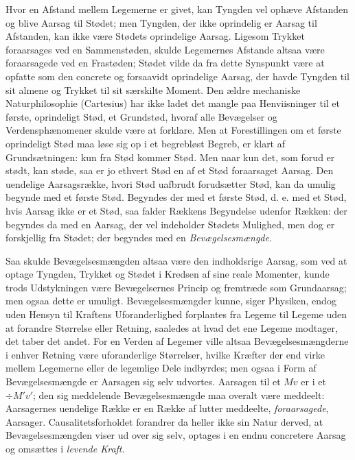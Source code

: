 \documentclass[12pt,a4paper]{book}
\begin{document}
Hvor en Afstand mellem Legemerne er givet, kan Tyngden vel ophæve
Afstanden og blive Aarsag til Stødet; men Tyngden, der ikke oprindelig er
Aarsag til Afstanden, kan ikke være Stødets oprindelige Aarsag. Ligesom
Trykket foraarsages ved en Sammenstøden, skulde Legemernes Afstande
altsaa være foraarsagede ved en Frastøden; Stødet vilde da fra dette
Synspunkt være at opfatte som den concrete og forsaavidt oprindelige
Aarsag, der havde Tyngden til sit almene og Trykket til sit særskilte
Moment. Den ældre mechaniske Naturphilosophie (Cartesius) har ikke ladet
det mangle paa Henviisninger til et første, oprindeligt Stød, et
Grundstød, hvoraf alle Bevægelser og Verdensphænomener skulde være at
forklare. Men at Forestillingen om et første oprindeligt Stød maa løse
sig op i et begrebløst Begreb, er klart af Grundsætningen: kun fra Stød
kommer Stød. Men naar kun det, som forud er stødt, kan støde, saa er jo
ethvert Stød en af et Stød foraarsaget Aarsag. Den uendelige
Aarsagsrække, hvori Stød uafbrudt forudsætter Stød, kan da umulig begynde
med et første Stød. Begyndes der med et første Stød, d. e. med et Stød,
hvis Aarsag ikke er et Stød, saa falder Rækkens Begyndelse udenfor
Rækken: der begyndes da med en Aarsag, der vel indeholder Stødets
Mulighed, men dog er forskjellig fra Stødet; der begyndes med en
\emph{Bevægelsesmængde}.

Saa skulde Bevægelsesmængden altsaa være den indholdsrige Aarsag, som ved
at optage Tyngden, Trykket og Stødet i Kredsen af sine reale Momenter,
kunde trods Udstykningen være Bevægelsernes Princip og fremtræde som
Grundaarsag; men ogsaa dette er umuligt. Bevægelsesmængder kunne, siger
Physiken, endog uden Hensyn til Kraftens Uforanderlighed forplantes fra
Legeme til Legeme uden at forandre Størrelse eller Retning, saaledes at
hvad det ene
Legeme modtager, det taber det andet. For en Verden af Legemer ville
altsaa Bevægelsesmængderne i enhver Retning være uforanderlige
Størrelser, hvilke Kræfter der end virke mellem Legemerne eller de
legemlige Dele indbyrdes; men ogsaa i Form af Bevægelsesmængde er
Aarsagen sig selv udvortes.
Aarsagen til et $Mv$ er i et $\div M'v'$;
den sig meddelende Bevægelsesmængde maa overalt være meddeelt:
Aarsagernes uendelige Række er en Række af lutter meddeelte,
\emph{foraarsagede}, Aarsager. Causalitetsforholdet forandrer da heller
ikke sin Natur derved, at Bevægelsesmængden viser ud over sig selv,
optages i en endnu concretere Aarsag og omsættes i \emph{levende
Kraft}.
\end{document}
